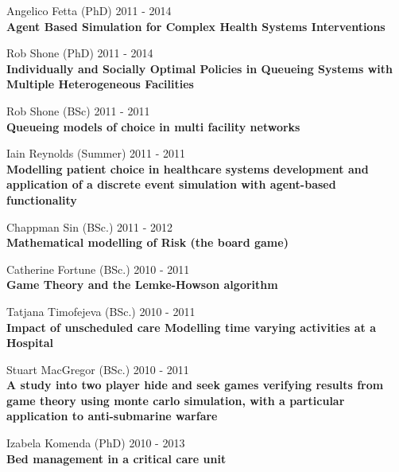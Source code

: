 \documentclass[10pt]{res} %
\begin{document}
\begin{resume}
\begin{etaremune}
\item
    Angelico Fetta (PhD) \hfill 2011 -
    2014\\
\textbf{Agent Based Simulation for Complex Health Systems Interventions}\\

\item
    Rob Shone (PhD) \hfill 2011 -
    2014\\
\textbf{Individually and Socially Optimal Policies in Queueing Systems with Multiple Heterogeneous Facilities}\\

\item
    Rob Shone (BSc) \hfill 2011 -
    2011\\
\textbf{Queueing models of choice in multi facility networks}\\

\item
    Iain Reynolds (Summer) \hfill 2011 -
    2011\\
\textbf{Modelling patient choice in healthcare systems development and application of a discrete event simulation with agent-based functionality}\\

\item
    Chappman Sin (BSc.) \hfill 2011 -
    2012\\
\textbf{Mathematical modelling of Risk (the board game)}\\

\item
    Catherine Fortune (BSc.) \hfill 2010 -
    2011\\
\textbf{Game Theory and the Lemke-Howson algorithm}\\

\item
    Tatjana Timofejeva (BSc.) \hfill 2010 -
    2011\\
\textbf{Impact of unscheduled care Modelling time varying activities at a Hospital}\\

\item
    Stuart MacGregor (BSc.) \hfill 2010 -
    2011\\
\textbf{A study into two player hide and seek games verifying results from game theory using monte carlo simulation, with a particular application to anti-submarine warfare}\\

\item
    Izabela Komenda (PhD) \hfill 2010 -
    2013\\
\textbf{Bed management in a critical care unit}\\


\end{etaremune}
\end{resume}
\end{document}
